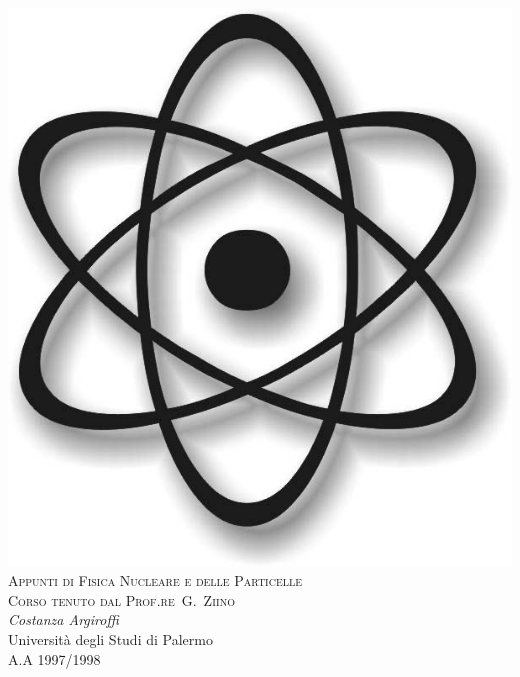 
\begin{titlepage}
\begin{center}
\includegraphics[scale=.3]{img/atom.jpeg}\\[1.5cm]
{\Huge\scshape\color{\MainColor} Appunti di Fisica Nucleare e delle Particelle}\\[1cm]
{\Large\scshape Corso tenuto dal Prof.re~G.~Ziino}\\[2cm]
{\large \textit{Costanza Argiroffi}\\[1em] Università degli Studi di Palermo \\ A.A 1997/1998}
\end{center}
\end{titlepage}

\restoregeometry